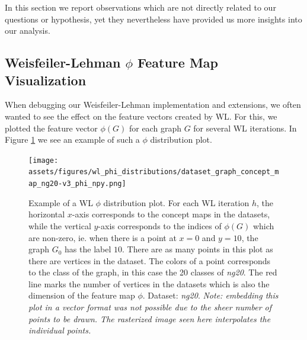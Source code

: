 In this section we report observations which are not directly related to our questions or hypothesis, yet they nevertheless have provided us more insights into our analysis.

\subsection{Weisfeiler-Lehman $\phi$ Feature Map Visualization}
When debugging our Weisfeiler-Lehman implementation and extensions, we often wanted to see the effect on the feature vectors created by WL.
For this, we plotted the feature vector $\phi(G)$ for each graph $G$ for several WL iterations.
In Figure \ref{fig:phi_distribution_example} we see an example of such a $\phi$ distribution plot.

\begin{figure}[htb!]
	\centering
	{\texttt{[image: assets/figures/wl\_phi\_distributions/dataset\_graph\_concept\_map\_ng20-v3\_phi\_npy.png]}
		\caption[Example: $\phi$ distribution plot]{%
			Example of a WL $\phi$ distribution plot.
			For each WL iteration $h$, the horizontal $x$-axis corresponds to the concept maps in the datasets, while the vertical $y$-axis corresponds to the indices of $\phi(G)$ which are non-zero, ie. when there is a point at $x=0$ and $y=10$, the graph $G_0$ has the label $10$.
			There are as many points in this plot as there are vertices in the dataset.
			The colors of a point corresponds to the class of the graph, in this case the 20 classes of \textit{ng20}.
			The red line marks the number of vertices in the datasets which is also the dimension of the feature map $\phi$.
			Dataset: \textit{ng20}.
			\textit{Note: embedding this plot in a vector format  was not possible due to the sheer number of points to be drawn. The rasterized image seen here interpolates the individual points.}
		}%
		\label{fig:phi_distribution_example}}
\end{figure}

